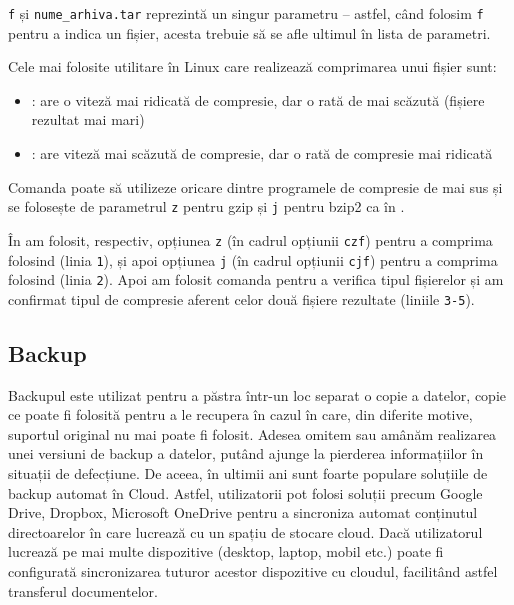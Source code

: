 \begin{note}[Observație]
\texttt{f} și \texttt{nume\_arhiva.tar} reprezintă un singur parametru – astfel, când folosim \texttt{f} pentru a indica un fișier, acesta trebuie să se afle ultimul în lista de parametri.
\end{note}

Cele mai folosite utilitare în Linux care realizează comprimarea unui fișier sunt:

\begin{itemize}
  \item {}: are o viteză mai ridicată de compresie, dar o rată de mai scăzută (fișiere rezultat mai mari)
  \item {}: are viteză mai scăzută de compresie, dar o rată de compresie mai ridicată
\end{itemize}

Comanda  poate să utilizeze oricare dintre programele de compresie de mai sus și se folosește de parametrul \texttt{z} pentru gzip și \texttt{j} pentru bzip2 ca în .


În  am folosit, respectiv, opțiunea \texttt{z} (în cadrul opțiunii \texttt{czf}) pentru a comprima folosind  (linia \texttt{1}), și apoi opțiunea \texttt{j} (în cadrul opțiunii \texttt{cjf}) pentru a comprima folosind  (linia \texttt{2}).
Apoi am folosit comanda  pentru a verifica tipul fișierelor și am confirmat tipul de compresie aferent celor două fișiere rezultate (liniile \texttt{3-5}).

\subsection{Backup}
\label{sec:fs:backup}

Backupul este utilizat pentru a păstra într-un loc separat o copie a datelor, copie ce poate fi folosită pentru a le recupera în cazul în care, din diferite motive, suportul original nu mai poate fi folosit.
Adesea omitem sau amânăm realizarea unei versiuni de backup a datelor, putând ajunge la pierderea informațiilor în situații de defecțiune.
De aceea, în ultimii ani sunt foarte populare soluțiile de backup automat în Cloud.
Astfel, utilizatorii pot folosi soluții precum Google Drive, Dropbox, Microsoft OneDrive pentru a sincroniza automat conținutul directoarelor în care lucrează cu un spațiu de stocare cloud.
Dacă utilizatorul lucrează pe mai multe dispozitive (desktop, laptop, mobil etc.) poate fi configurată sincronizarea tuturor acestor dispozitive cu cloudul, facilitând astfel transferul documentelor.

